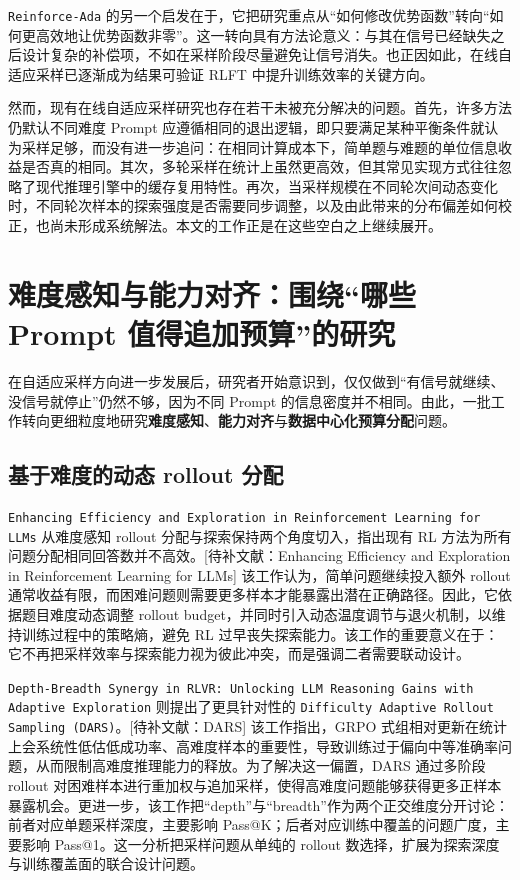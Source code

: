 \texttt{Reinforce-Ada} 的另一个启发在于，它把研究重点从“如何修改优势函数”转向“如何更高效地让优势函数非零”。这一转向具有方法论意义：与其在信号已经缺失之后设计复杂的补偿项，不如在采样阶段尽量避免让信号消失。也正因如此，在线自适应采样已逐渐成为结果可验证 RLFT 中提升训练效率的关键方向。

然而，现有在线自适应采样研究也存在若干未被充分解决的问题。首先，许多方法仍默认不同难度 Prompt 应遵循相同的退出逻辑，即只要满足某种平衡条件就认为采样足够，而没有进一步追问：在相同计算成本下，简单题与难题的单位信息收益是否真的相同。其次，多轮采样在统计上虽然更高效，但其常见实现方式往往忽略了现代推理引擎中的缓存复用特性。再次，当采样规模在不同轮次间动态变化时，不同轮次样本的探索强度是否需要同步调整，以及由此带来的分布偏差如何校正，也尚未形成系统解法。本文的工作正是在这些空白之上继续展开。

\section{难度感知与能力对齐：围绕“哪些 Prompt 值得追加预算”的研究}

在自适应采样方向进一步发展后，研究者开始意识到，仅仅做到“有信号就继续、没信号就停止”仍然不够，因为不同 Prompt 的信息密度并不相同。由此，一批工作转向更细粒度地研究\textbf{难度感知}、\textbf{能力对齐}与\textbf{数据中心化预算分配}问题。

\subsection{基于难度的动态 rollout 分配}

\texttt{Enhancing Efficiency and Exploration in Reinforcement Learning for LLMs} 从难度感知 rollout 分配与探索保持两个角度切入，指出现有 RL 方法为所有问题分配相同回答数并不高效。[待补文献：Enhancing Efficiency and Exploration in Reinforcement Learning for LLMs] 该工作认为，简单问题继续投入额外 rollout 通常收益有限，而困难问题则需要更多样本才能暴露出潜在正确路径。因此，它依据题目难度动态调整 rollout budget，并同时引入动态温度调节与退火机制，以维持训练过程中的策略熵，避免 RL 过早丧失探索能力。该工作的重要意义在于：它不再把采样效率与探索能力视为彼此冲突，而是强调二者需要联动设计。

\texttt{Depth-Breadth Synergy in RLVR: Unlocking LLM Reasoning Gains with Adaptive Exploration} 则提出了更具针对性的 \texttt{Difficulty Adaptive Rollout Sampling (DARS)}。[待补文献：DARS] 该工作指出，GRPO 式组相对更新在统计上会系统性低估低成功率、高难度样本的重要性，导致训练过于偏向中等准确率问题，从而限制高难度推理能力的释放。为了解决这一偏置，DARS 通过多阶段 rollout 对困难样本进行重加权与追加采样，使得高难度问题能够获得更多正样本暴露机会。更进一步，该工作把“depth”与“breadth”作为两个正交维度分开讨论：前者对应单题采样深度，主要影响 Pass@K；后者对应训练中覆盖的问题广度，主要影响 Pass@1。这一分析把采样问题从单纯的 rollout 数选择，扩展为探索深度与训练覆盖面的联合设计问题。

